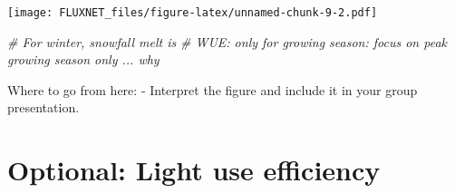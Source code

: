\documentclass[
]{article}
\newenvironment{Shaded}{\begin{snugshade}}{\end{snugshade}}
\newcommand{\AttributeTok}[1]{\textcolor[rgb]{0.13,0.29,0.53}{#1}}
\newcommand{\CommentTok}[1]{\textcolor[rgb]{0.56,0.35,0.01}{\textit{#1}}}
\newcommand{\ConstantTok}[1]{\textcolor[rgb]{0.56,0.35,0.01}{#1}}
\newcommand{\DecValTok}[1]{\textcolor[rgb]{0.00,0.00,0.81}{#1}}
\newcommand{\FloatTok}[1]{\textcolor[rgb]{0.00,0.00,0.81}{#1}}
\newcommand{\FunctionTok}[1]{\textcolor[rgb]{0.13,0.29,0.53}{\textbf{#1}}}
\newcommand{\NormalTok}[1]{#1}
\newcommand{\SpecialCharTok}[1]{\textcolor[rgb]{0.81,0.36,0.00}{\textbf{#1}}}
\begin{document}
\begin{Shaded}
\end{Shaded}

\texttt{[image: FLUXNET\_files/figure-latex/unnamed-chunk-9-2.pdf]}

\begin{Shaded}
\begin{Highlighting}[]
\CommentTok{\# For winter, snowfall melt is }
\CommentTok{\# WUE: only for growing season: focus on peak growing season only ... why }
\end{Highlighting}
\end{Shaded}

Where to go from here: - Interpret the figure and include it in your
group presentation.

\section{Optional: Light use
efficiency}\label{optional-light-use-efficiency}
\end{document}
